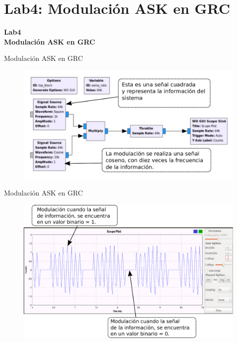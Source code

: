 \section{Lab4: Modulación ASK en GRC}

\begin{frame}{}


\bfseries{\textrm{\LARGE Lab4\\ \Large Modulación ASK en GRC}}
\raggedright
\end{frame}


\begin{frame}{Modulación ASK en GRC}



\begin{figure}[H]
\centering
\includegraphics[width=\textwidth]{lab4/pdf/lab4_1.pdf}
\end{figure}
\end{frame}

\begin{frame}{Modulación ASK en GRC}
\begin{figure}[H]
\centering
\includegraphics[width=\textwidth]{lab4/pdf/lab4_2.pdf}
\end{figure}
\end{frame}

